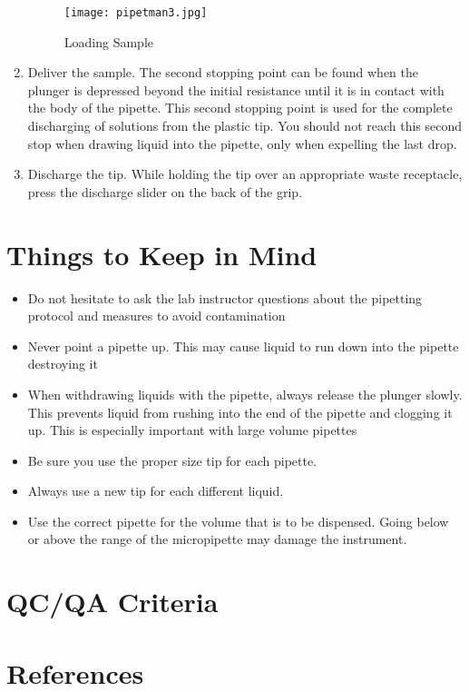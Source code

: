 \documentclass[12pt]{../SOP4_alpha}\usepackage[]{graphicx}\usepackage[]{xcolor}
\begin{document}
\begin{enumerate}
\begin{figure} [h!]
\caption{Loading Sample}
\texttt{[image: pipetman3.jpg]}
\end{figure}

\item Deliver the sample. The second stopping point can be found when the plunger is depressed beyond the initial resistance until it is in contact with the body of the pipette. This second stopping point is used for the complete discharging of solutions from the plastic tip. You should not reach this second stop when drawing liquid into the pipette, only when expelling the last drop.   
\item Discharge the tip. While holding the tip over an appropriate waste receptacle, press the discharge slider on the back of the grip.     

\end{enumerate}
\section{Things to Keep in Mind}
\begin{itemize}
  \item Do not hesitate to ask the lab instructor questions about the pipetting protocol and measures to avoid contamination 
\item Never point a pipette up. This may cause liquid to run down into the pipette destroying it
\item When withdrawing liquids with the pipette, always release the plunger slowly. This prevents liquid from rushing into the end of the pipette and clogging it up.  This is especially important with large volume pipettes 
\item Be sure you use the proper size tip for each pipette. 
\item Always use a new tip for each different liquid.
\item Use the correct pipette for the volume that is to be dispensed. Going below or above the range of the micropipette may damage the instrument.      

\end{itemize}





\section{QC/QA Criteria}

\section{References}
\end{document}
